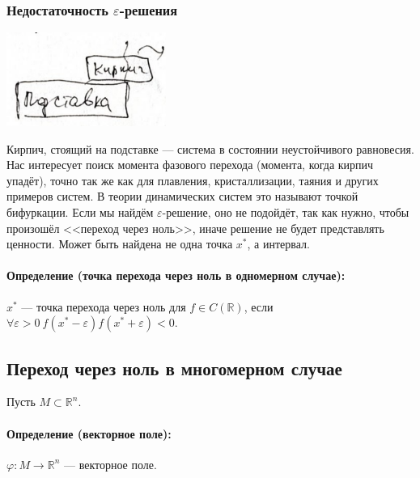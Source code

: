 \subsubsection{Недостаточность $\varepsilon$-решения}
\begin{center}
    \includegraphics[width=5.2cm]{../figures/lection_1/figure_1.png}
\end{center}
Кирпич, стоящий на подставке --- система в состоянии неустойчивого равновесия. Нас интересует поиск момента фазового перехода (момента, когда кирпич упадёт), точно так же как для плавления, кристаллизации, таяния и других примеров систем. В теории динамических систем это называют точкой бифуркации. Если мы найдём $\varepsilon$-решение, оно не подойдёт, так как нужно, чтобы произошёл <<переход через ноль>>, иначе решение не будет представлять ценности. Может быть найдена не одна точка $x^*$, а интервал.
\paragraph{Определение (точка перехода через ноль в одномерном случае):} $x^*$ --- точка перехода через ноль для $f\in C(\mathbb{R})$, если $\forall \varepsilon > 0 \  f(x^*-\varepsilon)f(x^*+\varepsilon) < 0$.
\subsection{Переход через ноль в многомерном случае}
Пусть $M \subset \mathbb{R}^n$.
\paragraph{Определение (векторное поле):} $\varphi:M\rightarrow\mathbb{R}^n$ --- векторное поле.
